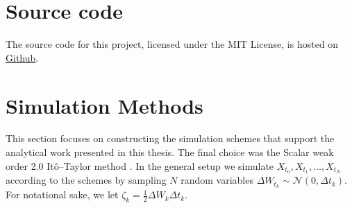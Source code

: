 \section{Source code}
The source code for this project, licensed under the MIT License, is hosted on \href{https://github.com/Gantzhorn/Thesis}{Github}.
\section{Simulation Methods}
This section focuses on constructing the simulation schemes that support the analytical work presented in this thesis. The final choice was 
the Scalar weak order 2.0 Itô–Taylor method \cite[algorithm 8.5]{Srkk2019}. In the general setup we simulate $X_{t_0},X_{t_1},\dots, X_{t_N}$ according to the schemes by sampling $N$ random variables $\Delta W_{t_k}\sim\mathcal{N}\left(0, \Delta t_k\right)$. For notational sake, we let $\zeta_k = \frac{1}{2}\Delta W_k\Delta t_k$. \\

